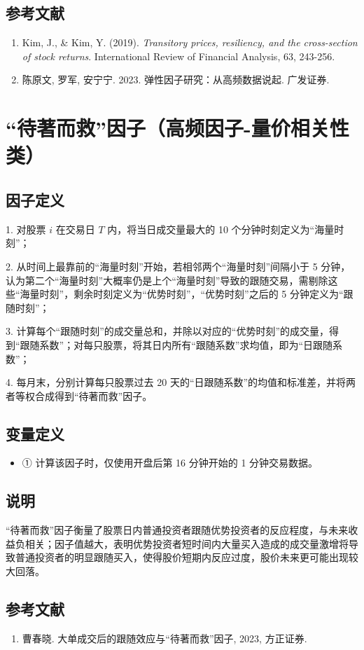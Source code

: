 \documentclass{article}
\begin{document}
\subsection{参考文献}
\begin{enumerate}
    \item Kim, J., \& Kim, Y. (2019). \textit{Transitory prices, resiliency, and the cross-section of stock returns}. International Review of Financial Analysis, 63, 243-256.
    \item 陈原文, 罗军, 安宁宁. 2023. 弹性因子研究：从高频数据说起. 广发证券.
\end{enumerate}

\section{“待著而救”因子（高频因子-量价相关性类）}

\subsection{因子定义}

1. 对股票 \( i \) 在交易日 \( T \) 内，将当日成交量最大的 10 个分钟时刻定义为“海量时刻”；

2. 从时间上最靠前的“海量时刻”开始，若相邻两个“海量时刻”间隔小于 5 分钟，认为第二个“海量时刻”大概率仍是上个“海量时刻”导致的跟随交易，需剔除这些“海量时刻”，剩余时刻定义为“优势时刻”，“优势时刻”之后的 5 分钟定义为“跟随时刻”；

3. 计算每个“跟随时刻”的成交量总和，并除以对应的“优势时刻”的成交量，得到“跟随系数”；对每只股票，将其日内所有“跟随系数”求均值，即为“日跟随系数”；

4. 每月末，分别计算每只股票过去 20 天的“日跟随系数”的均值和标准差，并将两者等权合成得到“待著而救”因子。

\subsection{变量定义}
\begin{itemize}
    \item ① 计算该因子时，仅使用开盘后第 16 分钟开始的 1 分钟交易数据。
\end{itemize}

\subsection{说明}
“待著而救”因子衡量了股票日内普通投资者跟随优势投资者的反应程度，与未来收益负相关；因子值越大，表明优势投资者短时间内大量买入造成的成交量激增将导致普通投资者的明显跟随买入，使得股价短期内反应过度，股价未来更可能出现较大回落。

\subsection{参考文献}
\begin{enumerate}
    \item 曹春晓. 大单成交后的跟随效应与“待著而救”因子, 2023, 方正证券.
\end{enumerate}
\end{document}
